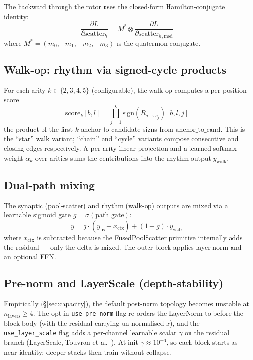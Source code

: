 \documentclass[10pt,a4paper]{article}
\begin{document}
The backward through the rotor uses the closed-form Hamilton-conjugate
identity:
\begin{equation}
\frac{\partial L}{\partial \mathrm{scatter}_h}
  = M^{*} \otimes \frac{\partial L}{\partial \mathrm{scatter}_{h,\text{mod}}}
\end{equation}
where $M^* = (m_0, -m_1, -m_2, -m_3)$ is the quaternion conjugate.

\subsection{Walk-op: rhythm via signed-cycle products}

For each arity $k \in \{2, 3, 4, 5\}$ (configurable), the walk-op
computes a per-position score
\begin{equation}
\mathrm{score}_k[b, l] = \prod_{j=1}^{k} \mathrm{sign}(R_{a \to c_j})[b, l, j]
\end{equation}
the product of the first $k$ anchor-to-candidate signs from
$\mathrm{anchor\_to\_cand}$. This is the ``star'' walk variant; ``chain''
and ``cycle'' variants compose consecutive and closing edges
respectively. A per-arity linear projection and a learned softmax weight
$\alpha_k$ over arities sums the contributions into the rhythm output
$y_{\text{walk}}$.

\subsection{Dual-path mixing}

The synaptic (pool-scatter) and rhythm (walk-op) outputs are mixed
via a learnable sigmoid gate $g = \sigma(\mathrm{path\_gate})$:
\begin{equation}
y = g \cdot (y_{\text{ps}} - x_{\text{ctx}}) + (1 - g) \cdot y_{\text{walk}}
\end{equation}
where $x_{\text{ctx}}$ is subtracted because the FusedPoolScatter
primitive internally adds the residual --- only the delta is mixed.
The outer block applies layer-norm and an optional FFN.

\subsection{Pre-norm and LayerScale (depth-stability)}

Empirically (\S\ref{sec:capacity}), the default post-norm topology
becomes unstable at $n_{\text{layers}} \geq 4$. The opt-in
\texttt{use\_pre\_norm} flag re-orders the LayerNorm to before the
block body (with the residual carrying un-normalised $x$), and the
\texttt{use\_layer\_scale} flag adds a per-channel learnable scalar
$\gamma$ on the residual branch (LayerScale,
Touvron et al.~\cite{touvron2021going}). At init $\gamma \approx 10^{-4}$,
so each block starts as near-identity; deeper stacks then train
without collapse.
\end{document}
